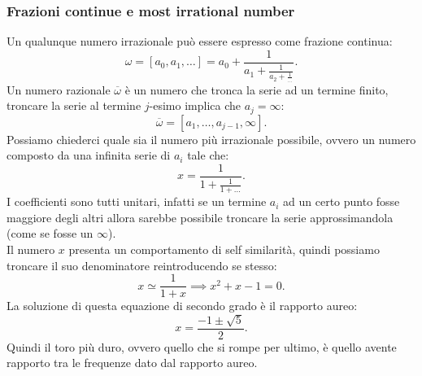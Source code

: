 \subsubsection{Frazioni continue e most irrational number}%
\label{subsub:Frazioni continue e most irrational number}
Un qualunque numero irrazionale può essere espresso come frazione continua:
\[
    \omega  = \left[a_0,a_1,\ldots\right] = a_0 + \frac{1}{a_1+\frac{1}{a_2+\frac{1}{\ldots}}}
.\] 
Un numero razionale $\overline{\omega}$ è un numero che tronca la serie ad un termine finito, troncare la serie al termine $j$-esimo implica che $a_j = \infty$:
\[
    \overline{\omega} = \left[a_1, \ldots, a_{j-1}, \infty\right]
.\] 
Possiamo chiederci quale sia il numero più irrazionale possibile, ovvero un numero composto da una infinita serie di $a_i$ tale che:
\[
    x = \frac{1}{1+\frac{1}{1+ \ldots}}
.\] 
I coefficienti sono tutti unitari, infatti se un termine $a_i$ ad un certo punto fosse maggiore degli altri allora sarebbe possibile troncare la serie approssimandola (come se fosse un $\infty$).\\
Il numero $x$ presenta un comportamento di self similarità, quindi possiamo troncare il suo denominatore reintroducendo se stesso:
\[
    x \simeq \frac{1}{1+x} \implies  x^2+x-1=0
.\] 
La soluzione di questa equazione di secondo grado è il rapporto aureo:
\[
    x = \frac{-1 \pm \sqrt{5}}{2}
.\] 
Quindi il toro più duro, ovvero quello che si rompe per ultimo, è quello avente rapporto tra le frequenze dato dal rapporto aureo.
\clearpage

